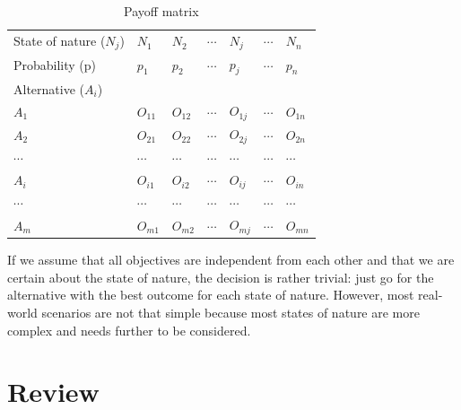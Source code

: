 \documentclass[
  12pt,
  oneside]{book}
\theoremstyle{definition}
\theoremstyle{definition}
\theoremstyle{definition}
\theoremstyle{definition}
\theoremstyle{remark}
\begin{document}
\begin{longtable}[]{@{}
  >{\raggedright\arraybackslash}p{}
  >{\raggedright\arraybackslash}p{}
  >{\raggedright\arraybackslash}p{}
  >{\raggedright\arraybackslash}p{}
  >{\raggedright\arraybackslash}p{}
  >{\raggedright\arraybackslash}p{}
  >{\raggedright\arraybackslash}p{}@{}}
\caption{Payoff matrix}\tabularnewline
\toprule\noalign{}
\endfirsthead
\endhead
\bottomrule\noalign{}
\endlastfoot
State of nature (\(N_j\)) & \(N_1\) & \(N_2\) & \(\cdots\) & \(N_j\) & \(\cdots\) & \(N_n\) \\
Probability (p) & \(p_1\) & \(p_2\) & \(\cdots\) & \(p_j\) & \(\cdots\) & \(p_n\) \\
Alternative (\(A_i\)) & & & & & & \\
\(A_1\) & \(O_{11}\) & \(O_{12}\) & \(\cdots\) & \(O_{1j}\) & \(\cdots\) & \(O_{1n}\) \\
\(A_2\) & \(O_{21}\) & \(O_{22}\) & \(\cdots\) & \(O_{2j}\) & \(\cdots\) & \(O_{2n}\) \\
\(\cdots\) & \(\cdots\) & \(\cdots\) & \(\cdots\) & \(\cdots\) & \(\cdots\) & \(\cdots\) \\
\(A_i\) & \(O_{i1}\) & \(O_{i2}\) & \(\cdots\) & \(O_{ij}\) & \(\cdots\) & \(O_{in}\) \\
\(\cdots\) & \(\cdots\) & \(\cdots\) & \(\cdots\) & \(\cdots\) & \(\cdots\) & \(\cdots\) \\
\(A_m\) & \(O_{m1}\) & \(O_{m2}\) & \(\cdots\) & \(O_{mj}\) & \(\cdots\) & \(O_{mn}\) \\
\end{longtable}

If we assume that all objectives are independent from each other and that we are certain about the state of nature, the decision is rather trivial: just go for the alternative with the best outcome for each state of nature. However, most real-world scenarios are not that simple because most states of nature are more complex and needs further to be considered.

\hypertarget{review}{%
\section{Review}\label{review}}
\end{document}
